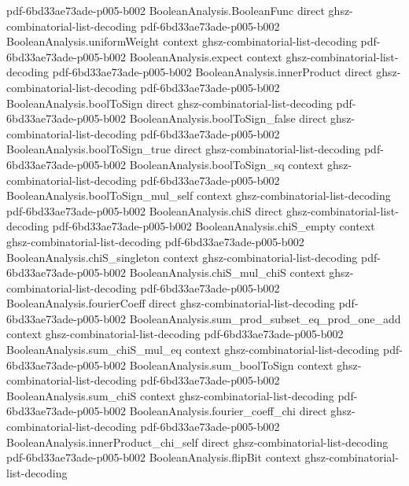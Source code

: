 \begin{theorem}
  {pdf-6bd33ae73ade-p005-b002}
\proofstep
  {BooleanAnalysis.BooleanFunc}
  {direct}
  {ghsz-combinatorial-list-decoding}
  {pdf-6bd33ae73ade-p005-b002}
\proofstep
  {BooleanAnalysis.uniformWeight}
  {context}
  {ghsz-combinatorial-list-decoding}
  {pdf-6bd33ae73ade-p005-b002}
\proofstep
  {BooleanAnalysis.expect}
  {context}
  {ghsz-combinatorial-list-decoding}
  {pdf-6bd33ae73ade-p005-b002}
\proofstep
  {BooleanAnalysis.innerProduct}
  {direct}
  {ghsz-combinatorial-list-decoding}
  {pdf-6bd33ae73ade-p005-b002}
\proofstep
  {BooleanAnalysis.boolToSign}
  {direct}
  {ghsz-combinatorial-list-decoding}
  {pdf-6bd33ae73ade-p005-b002}
\proofstep
  {BooleanAnalysis.boolToSign_false}
  {direct}
  {ghsz-combinatorial-list-decoding}
  {pdf-6bd33ae73ade-p005-b002}
\proofstep
  {BooleanAnalysis.boolToSign_true}
  {direct}
  {ghsz-combinatorial-list-decoding}
  {pdf-6bd33ae73ade-p005-b002}
\proofstep
  {BooleanAnalysis.boolToSign_sq}
  {context}
  {ghsz-combinatorial-list-decoding}
  {pdf-6bd33ae73ade-p005-b002}
\proofstep
  {BooleanAnalysis.boolToSign_mul_self}
  {context}
  {ghsz-combinatorial-list-decoding}
  {pdf-6bd33ae73ade-p005-b002}
\proofstep
  {BooleanAnalysis.chiS}
  {direct}
  {ghsz-combinatorial-list-decoding}
  {pdf-6bd33ae73ade-p005-b002}
\proofstep
  {BooleanAnalysis.chiS_empty}
  {context}
  {ghsz-combinatorial-list-decoding}
  {pdf-6bd33ae73ade-p005-b002}
\proofstep
  {BooleanAnalysis.chiS_singleton}
  {context}
  {ghsz-combinatorial-list-decoding}
  {pdf-6bd33ae73ade-p005-b002}
\proofstep
  {BooleanAnalysis.chiS_mul_chiS}
  {context}
  {ghsz-combinatorial-list-decoding}
  {pdf-6bd33ae73ade-p005-b002}
\proofstep
  {BooleanAnalysis.fourierCoeff}
  {direct}
  {ghsz-combinatorial-list-decoding}
  {pdf-6bd33ae73ade-p005-b002}
\proofstep
  {BooleanAnalysis.sum_prod_subset_eq_prod_one_add}
  {context}
  {ghsz-combinatorial-list-decoding}
  {pdf-6bd33ae73ade-p005-b002}
\proofstep
  {BooleanAnalysis.sum_chiS_mul_eq}
  {context}
  {ghsz-combinatorial-list-decoding}
  {pdf-6bd33ae73ade-p005-b002}
\proofstep
  {BooleanAnalysis.sum_boolToSign}
  {context}
  {ghsz-combinatorial-list-decoding}
  {pdf-6bd33ae73ade-p005-b002}
\proofstep
  {BooleanAnalysis.sum_chiS}
  {context}
  {ghsz-combinatorial-list-decoding}
  {pdf-6bd33ae73ade-p005-b002}
\proofstep
  {BooleanAnalysis.fourier_coeff_chi}
  {direct}
  {ghsz-combinatorial-list-decoding}
  {pdf-6bd33ae73ade-p005-b002}
\proofstep
  {BooleanAnalysis.innerProduct_chi_self}
  {direct}
  {ghsz-combinatorial-list-decoding}
  {pdf-6bd33ae73ade-p005-b002}
\proofstep
  {BooleanAnalysis.flipBit}
  {context}
  {ghsz-combinatorial-list-decoding}

\end{theorem}
